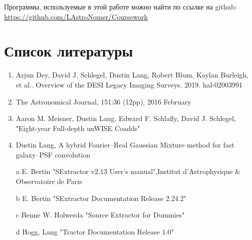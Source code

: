 \documentclass[12pt,a4paper]{article}
\begin{document}
Программы, используемые в этой работе можно найти по ссылке на github: \href{https://github.com/LAstroNomer/Coursework}{https://github.com/LAstroNomer/Coursework}    
		
\section{Список литературы}

\begin{enumerate}

\item Arjun Dey, David J. Schlegel, Dustin Lang, Robert Blum, Kaylan Burleigh, et al.. Overview of the
DESI Legacy Imaging Surveys. 2019. hal-02003991 \label{1}
\item The Astronomical Journal, 151:36 (12pp), 2016 February \label{2}
\item Aaron M. Meisner, Dustin Lang, Edward F. Schlafly, David J. Schlegel, "Eight-year Full-depth unWISE Coadds" \label{3}
\item Dustin Lang, A hybrid Fourier–Real Gaussian Mixture method for fast galaxy–PSF convolution \label{4}

\item[a] E. Bertin "SExtractor v2.13 User’s manual",Institut d’Astrophysique \& Observatoire de Paris  \label{a}
\item[b] E. Bertin "SExtractor Documentation Release 2.24.2" \label{b} 
\item[c] Benne W. Holwerda "Source Extractor for Dummies" \label{c}
\item[d] Hogg, Lang "Tractor Documentation Release 1.0" 

\end{enumerate}
\end{document}
